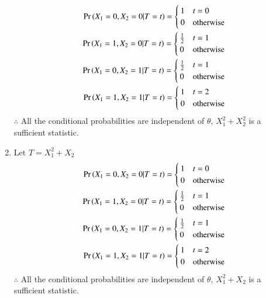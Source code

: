 \documentclass[journal,12pt,twocolumn]{IEEEtran}
\begin{document}
\begin{enumerate}
\begin{align}
        \Pr\left(X_1=0,X_2=0 | T=t\right) = 
        \begin{cases}
            1 & t=0\\
            0 & \text{otherwise}
        \end{cases}\\
        \Pr\left(X_1=1,X_2=0 | T=t\right) = 
        \begin{cases}
            \frac{1}{2} & t=1\\
            0 & \text{otherwise}
        \end{cases}\\
        \Pr\left(X_1=0,X_2=1 | T=t\right) = 
        \begin{cases}
            \frac{1}{2} & t=1\\
            0 & \text{otherwise}
        \end{cases}\\
        \Pr\left(X_1=1,X_2=1 | T=t\right) = 
        \begin{cases}
            1 & t=2\\
            0 & \text{otherwise}
        \end{cases}
    \end{align}
    $\therefore$ All the conditional probabilities are independent of $\theta$, $X_1^2+X_2^2$ is a sufficient statistic.
    \item Let $T=X_1^2+X_2$
    \begin{align}
        \Pr\left(X_1=0,X_2=0 | T=t\right) = 
        \begin{cases}
            1 & t=0\\
            0 & \text{otherwise}
        \end{cases}\\
        \Pr\left(X_1=1,X_2=0 | T=t\right) = 
        \begin{cases}
            \frac{1}{2} & t=1\\
            0 & \text{otherwise}
        \end{cases}\\
        \Pr\left(X_1=0,X_2=1 | T=t\right) = 
        \begin{cases}
            \frac{1}{2} & t=1\\
            0 & \text{otherwise}
        \end{cases}\\
        \Pr\left(X_1=1,X_2=1 | T=t\right) = 
        \begin{cases}
            1 & t=2\\
            0 & \text{otherwise}
        \end{cases}
    \end{align}
    $\therefore$ All the conditional probabilities are independent of $\theta$, $X_1^2+X_2$ is a sufficient statistic.
\end{enumerate}
\end{document}
